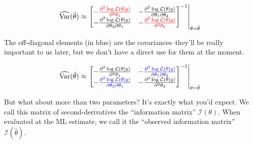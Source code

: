 \documentclass[
]{book}
\begin{document}
\[
\begin{equation*}
\widehat{\text{Var}}(\hat{\theta}) \approx \left. \left[ 
\displaystyle \begin{matrix}
\color{red}{- \frac{\partial^2 \log \mathcal{L}(\theta| y)}{\partial^2 \theta_1}} & - \frac{\partial^2 \log \mathcal{L}(\theta| y)}{\partial \theta_1 \partial \theta_2}\\
- \frac{\partial^2 \log \mathcal{L}(\theta| y)}{\partial \theta_2 \partial \theta_1} & \color{red}{- \frac{\partial^2 \log \mathcal{L}(\theta| y)}{\partial^2 \theta_2}}\\
\end{matrix}\right]^{-1} \right|_{\theta = \hat{\theta}}
\end{equation*}
\]

The off-diagonal elements (in blue) are the covariances--they'll be
really important to us later, but we don't have a direct use for them at
the moment.

\[
\begin{equation*}
\widehat{\text{Var}}(\hat{\theta}) \approx \left. \left[ 
\displaystyle \begin{matrix}
- \frac{\partial^2 \log \mathcal{L}(\theta| y)}{\partial^2 \theta_1} & \color{blue}{- \frac{\partial^2 \log \mathcal{L}(\theta| y)}{\partial \theta_1 \partial \theta_2}}\\
\color{blue}{- \frac{\partial^2 \log \mathcal{L}(\theta| y)}{\partial \theta_2 \partial \theta_1}} & - \frac{\partial^2 \log \mathcal{L}(\theta| y)}{\partial^2 \theta_2}\\
\end{matrix}\right]^{-1} \right|_{\theta = \hat{\theta}}
\end{equation*}
\]

But what about more than two parameters? It's exactly what you'd expect.
We call this matrix of second-derivatives the ``information matrix''
\(\mathcal{I}(\theta)\). When evaluated at the ML estimate, we call it
the ``observed information matrix'' \(\mathcal{I}(\hat{\theta})\).
\end{document}
